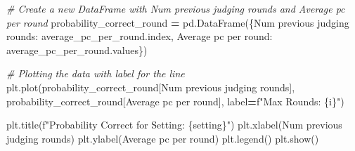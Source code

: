 \documentclass[
]{article}
\newenvironment{Shaded}{\begin{snugshade}}{\end{snugshade}}
\newcommand{\CommentTok}[1]{\textcolor[rgb]{0.56,0.35,0.01}{\textit{#1}}}
\newcommand{\NormalTok}[1]{#1}
\newcommand{\OperatorTok}[1]{\textcolor[rgb]{0.81,0.36,0.00}{\textbf{#1}}}
\newcommand{\SpecialCharTok}[1]{\textcolor[rgb]{0.00,0.00,0.00}{#1}}
\newcommand{\SpecialStringTok}[1]{\textcolor[rgb]{0.31,0.60,0.02}{#1}}
\newcommand{\StringTok}[1]{\textcolor[rgb]{0.31,0.60,0.02}{#1}}
\begin{document}
\begin{Shaded}
\begin{Highlighting}[]
      \CommentTok{\# Create a new DataFrame with \textquotesingle{}Num previous judging rounds\textquotesingle{} and \textquotesingle{}Average pc per round\textquotesingle{}}
\NormalTok{      probability\_correct\_round }\OperatorTok{=}\NormalTok{ pd.DataFrame(\{}\StringTok{\textquotesingle{}Num previous judging rounds\textquotesingle{}}\NormalTok{: average\_pc\_per\_round.index,}
                                                \StringTok{\textquotesingle{}Average pc per round\textquotesingle{}}\NormalTok{: average\_pc\_per\_round.values\})}
  
      \CommentTok{\# Plotting the data with label for the line}
\NormalTok{      plt.plot(probability\_correct\_round[}\StringTok{\textquotesingle{}Num previous judging rounds\textquotesingle{}}\NormalTok{], probability\_correct\_round[}\StringTok{\textquotesingle{}Average pc per round\textquotesingle{}}\NormalTok{], label}\OperatorTok{=}\SpecialStringTok{f"Max Rounds: }\SpecialCharTok{\{}\NormalTok{i}\SpecialCharTok{\}}\SpecialStringTok{"}\NormalTok{)}
  
\NormalTok{  plt.title(}\SpecialStringTok{f"Probability Correct for Setting: }\SpecialCharTok{\{}\NormalTok{setting}\SpecialCharTok{\}}\SpecialStringTok{"}\NormalTok{) }
\NormalTok{  plt.xlabel(}\StringTok{\textquotesingle{}Num previous judging rounds\textquotesingle{}}\NormalTok{)}
\NormalTok{  plt.ylabel(}\StringTok{\textquotesingle{}Average pc per round\textquotesingle{}}\NormalTok{)}
\NormalTok{  plt.legend()}
\NormalTok{  plt.show()}
\end{Highlighting}
\end{Shaded}
\end{document}

